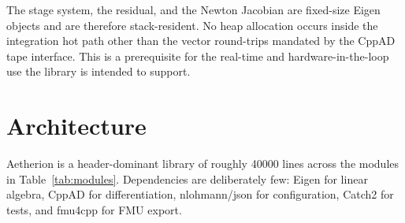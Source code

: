 \documentclass[a4paper,10pt]{article}
\theoremstyle{definition}
\begin{document}
The stage system, the residual, and the Newton Jacobian are fixed-size Eigen
objects and are therefore stack-resident.  No heap allocation occurs inside
the integration hot path other than the vector round-trips mandated by the
CppAD tape interface.  This is a prerequisite for the real-time and
hardware-in-the-loop use the library is intended to support.

\section{Architecture}
\label{sec:arch}

Aetherion is a header-dominant library of roughly \num{40000} lines across
the modules in Table~\ref{tab:modules}.  Dependencies are deliberately few:
Eigen for linear algebra, CppAD for differentiation, nlohmann/json for
configuration, Catch2 for tests, and fmu4cpp for FMU export.
\end{document}
